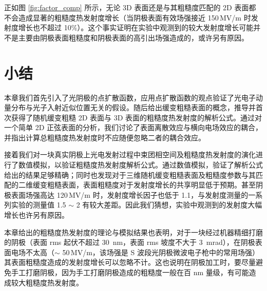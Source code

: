 正如图 \ref{fig:factor_comp} 所示，无论 3D 表面还是与其粗糙度匹配的 2D 表面都不会造成显著的粗糙度热发射度增长（当阴极表面有效场强接近 150\,MV/m 时发射度增长也不超过 10\%）。这个事实证明在实验中观测到的较大发射度增长可能并不是主要由阴极表面粗糙度和阴极表面的高引出场强造成的，或许另有原因。

\section{小结}
本章我们首先引入了光阴极的点扩散函数，应用点扩散函数的观点验证了光电子动量分布与光子入射近似位置无关的假设。随后给出缓变粗糙表面的概念，推导并首次获得了随机缓变粗糙 2D 表面与 3D 表面的粗糙度热发射度的解析公式。通过对一个简单 2D 正弦表面的分析，我们讨论了表面离散效应与横向电场效应的耦合，并指出计算总粗糙度热发射度时不应随便忽略二者的耦合效应。

接着我们对一块真实阴极上光电发射过程中束团相空间及粗糙度热发射度的演化进行了数值模拟，以验证粗糙度热发射度解析公式。通过数值模拟，验证了解析公式给出的结果足够精确；同时也发现对于三维随机缓变粗糙表面及粗糙度参数与其匹配的二维缓变粗糙表面，表面粗糙度对于发射度增长的共享明显低于预期。甚至阴极表面场强高达 120\,MV/m 时，发射度增长因子也低于 1.1，与发射度测量的一系列实验的测量值 1.5 $\sim$ 2 有较大差距。因此我们猜想，实验中观测到的发射度大幅增长也许另有原因。

本章给出的粗糙度热发射度的理论与模拟结果也表明，对于一块经过机器精细打磨的阴极（表面 rms 起伏不超过 \SI{30}{nm}，表面 rms 坡度不大于 \SI{3}{mrad}），在阴极表面电场不太高（$\sim$ 50\,MV/m，该场强是 S 波段光阴极微波电子枪中的常用场强）其表面粗糙度造成的发射度增长可以忽略不计。这也说明在阴极加工时，要尽量避免手工打磨阴极，因为手工打磨阴极造成的粗糙度一般在百 nm 量级，有可能造成较大粗糙度热发射度。
